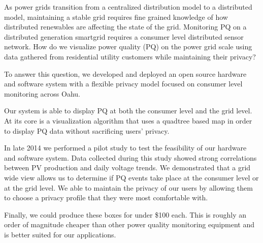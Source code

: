 As power grids transition from a centralized distribution model to a distributed model, maintaining a stable grid requires fine grained knowledge of how distributed renewables are affecting the state of the grid. Monitoring PQ on a distributed generation smartgrid requires a consumer level distributed sensor network. How do we visualize power quality (PQ) on the power grid scale using data gathered from residential utility customers while maintaining their privacy?

To answer this question, we developed and deployed an open source hardware and software system with a flexible privacy model focused on consumer level monitoring across Oahu. 

Our system is able to display PQ at both the consumer level and the grid level. At its core is a visualization algorithm that uses a quadtree based map in order to display PQ data without sacrificing users' privacy.

In late 2014 we performed a pilot study to test the feasibility of our hardware and software system. Data collected during this study showed strong correlations between PV production and daily voltage trends. We demonstrated that a grid wide view allows us to determine if PQ events take place at the consumer level or at the grid level. We  able to maintain the privacy of our users by allowing them to choose a privacy profile that they were most comfortable with.

Finally, we could produce these boxes for under \$100 each. This is roughly an order of magnitude cheaper than other power quality monitoring equipment and is better suited for our applications.